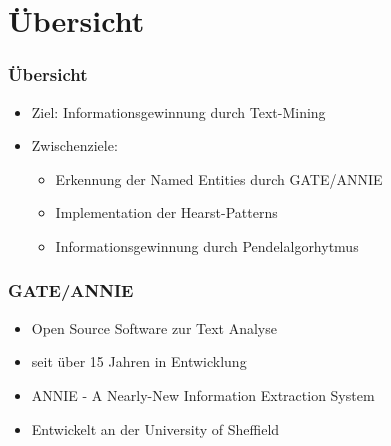 \section{Übersicht}
\label{sec:uebersicht}

\begin{frame}
  \frametitle{Übersicht}

  \begin{itemize}
  \item Ziel: Informationsgewinnung durch Text-Mining
  \item Zwischenziele:
  \begin{itemize}
    \item \color{green}Erkennung der Named Entities durch GATE/ANNIE
    \item Implementation der Hearst-Patterns
    \item \color{red}Informationsgewinnung durch Pendelalgorhytmus
  \end{itemize}
  \end{itemize}
\end{frame}

\begin{frame}
  \frametitle{GATE/ANNIE}
  \begin{itemize}
    \item Open Source Software zur Text Analyse
    \item seit über 15 Jahren in Entwicklung
    \item ANNIE - A Nearly-New Information Extraction System
    \item Entwickelt an der University of Sheffield
  \end{itemize}
\end{frame}
